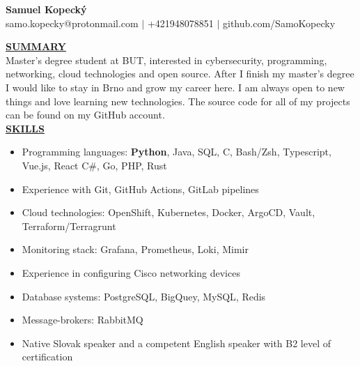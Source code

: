 \documentclass[11pt]{article}
\begin{document}
\begin{center}
\thispagestyle{empty}
\Large \textbf{Samuel Kopecký \\}
\normalsize samo.kopecky@protonmail.com $\mid$ +421948078851 $\mid$ github.com/SamoKopecky    \\
\hrulefill
\end{center}



\noindent \textbf{\underline{SUMMARY}} \\
\noindent Master's degree student at BUT, interested in cybersecurity, programming, networking, cloud technologies and open source. After I finish my master's degree I would like to stay in Brno and grow my career here. I am always open to new things and love learning new technologies. The source code for all of my projects can be found on my GitHub account.  \\


\noindent \textbf{\underline{SKILLS}} 
\begin{itemize}[noitemsep,nolistsep,leftmargin=*]
\item {Programming languages: \textbf{Python}, Java, SQL, C, Bash/Zsh, Typescript, Vue.js, React C\#, Go, PHP, Rust}
\item {Experience with Git, GitHub Actions, GitLab pipelines}
\item {Cloud technologies: OpenShift, Kubernetes, Docker, ArgoCD, Vault, Terraform/Terragrunt}
\item {Monitoring stack: Grafana, Prometheus, Loki, Mimir}
\item {Experience in configuring Cisco networking devices}
\item {Database systems: PostgreSQL, BigQuey, MySQL, Redis}
\item {Message-brokers: RabbitMQ}
\item {Native Slovak speaker and a competent English speaker with B2 level of certification \\}
\end{itemize}
\end{document}
